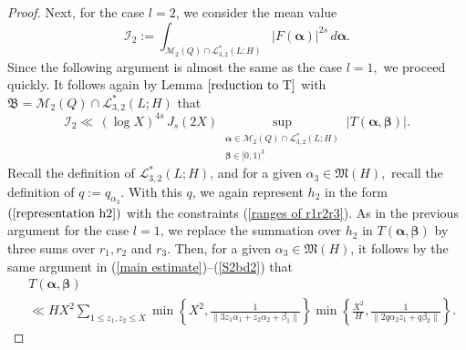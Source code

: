 \documentclass{amsart}%
\numberwithin{equation}{section}
\theoremstyle{remark}
\newcommand{\cI}{\mathcal I}
\newcommand{\Z}{\mathbb{Z}}
\newcommand{\1}{\mathbbm{1}}
\begin{document}
\begin{proof}
Next, for the case $l=2$, we consider the mean value 
\begin{equation*}\label{mean value l>1}
    \cI_2 := \int_{\mathcal{M}_2(Q)\cap \mathcal{L}^*_{3,2}(L;H)}|F(\boldsymbol{\alpha})|^{2s}\, d\boldsymbol{\alpha}.
\end{equation*}
Since the following argument is almost the same as the case $l=1,$ we proceed quickly. It follows again by Lemma $\ref{reduction to T}$ with $\mathfrak{B}=\mathcal{M}_2(Q)\cap \mathcal{L}^*_{3,2}(L;H)$ that 
\begin{equation}\label{bound for mean value over Mlcap L(l+1,l)}
   \cI_2 \ll  \, (\log X)^{4s} \, J_s(2X) \sup_{\substack{\boldsymbol{\alpha}\in \mathcal{M}_2(Q)\cap \mathcal{L}^*_{3,2}(L;H)\\ \boldsymbol{\beta}\in [0,1)^3 }} |T(\boldsymbol{\alpha},\boldsymbol{\beta})|.
\end{equation}
Recall the definition of $\mathcal{L}^*_{3,2}(L;H)$, and for a given $\alpha_{3}\in \mathfrak{M}(H),$ recall the definition of $q:=q_{\alpha_{3}}$.  With this $q$,  we again represent $h_2$ in the form $(\ref{representation h2})$ with
the constraints (\ref{ranges of r1r2r3}).
As in the previous argument for the case $l=1$, we replace the summation over $h_{2}$ in $T(\boldsymbol{\alpha},\boldsymbol{\beta})$ by three sums over $r_1,r_2$ and $r_3$. 
Then, for a given $\alpha_{3}\in \mathfrak{M}(H)$, it follows by the same argument in (\ref{main estimate})--(\ref{S2bd2}) that
\begin{equation*}
\begin{aligned}
&T(\boldsymbol{\alpha},\boldsymbol{\beta})\\
&\ll HX^{2} \! \! \sum_{1\leq z_1,z_2\leq X} \! \! \min\left\{X^{2},\frac{1}{\|3z_1\alpha_{1}+z_2\alpha_2+\beta_{1}\|}\right\} \min\left\{\frac{X^{2}}{H},\frac{1}{\|2q\alpha_2z_1+q\beta_2\|}\right\}.
\end{aligned}
\end{equation*}


\end{proof}
\end{document}
